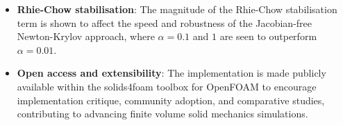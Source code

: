 \documentclass[sn-mathphys,Numbered]{sn-jnl}%
\begin{document}
\begin{itemize}
	\item \textbf{Rhie-Chow stabilisation}: The magnitude of the Rhie-Chow stabilisation term is shown to affect the speed and robustness of the Jacobian-free Newton-Krylov approach, where $\alpha = 0.1$ and $1$ are seen to outperform $\alpha = 0.01$.

	\item \textbf{Open access and extensibility}: The implementation is made publicly available within the solids4foam toolbox for OpenFOAM to encourage implementation critique, community adoption, and comparative studies, contributing to advancing finite volume solid mechanics simulations.
\end{itemize}

\end{document}
